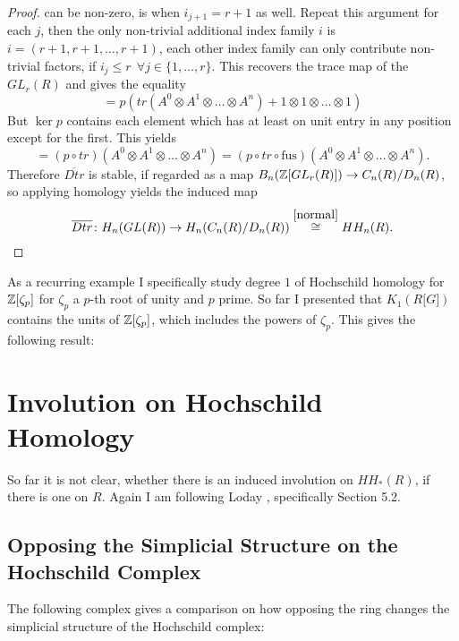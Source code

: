 {\begin{proof}
can be non-zero, is when $i_{j+1}=r+1$ as well. Repeat this argument for each $j$, then the only non-trivial additional index
family $i$ is $i=(r+1,r+1,\ldots,r+1)$, each other index family can only contribute
non-trivial factors, if $i_j\leq r  ~~\forall j\in \{1,\ldots,r\}$. This recovers the trace map of the $GL_r(R)$ and gives the equality
$$=p\left(tr( A^0 \otimes A^1 \otimes \ldots \otimes A^n) + 1\otimes 1\otimes\ldots\otimes 1\right)$$
But $\ker p$ contains each element which has at least on unit entry in any position except for the first. This yields
$$=(p\circ tr)( A^0 \otimes A^1 \otimes \ldots \otimes A^n) = (p\circ tr\circ \mathrm{fus})( A^0 \otimes A^1 \otimes \ldots \otimes A^n).$$
Therefore $\overline{Dtr}$ is stable, if regarded as a map $B_n(\mathbb{Z}\lbrack GL_r(R)\rbrack) \rightarrow C_n(R)/D_n(R)$, so applying homology yields the induced map
$$\overline{Dtr}\colon H_n(GL(R))\rightarrow H_n(C_n(R)/D_n(R)) \stackrel{\mathrm{\ref{normal}}}{\cong}HH_n(R).$$
\end{proof}}

As a recurring example I specifically study degree $1$ of Hochschild homology for $\mathbb{Z}\lbrack \zeta_p \rbrack$ for $\zeta_p$ a $p$-th root of unity and $p$ prime.
So far I presented  that $K_1(R\lbrack G \rbrack)$ contains the units of $\mathbb{Z}\lbrack \zeta_p \rbrack$, which includes the powers of $\zeta_p$.
This gives the following result:



\section{Involution on Hochschild Homology}
So far it is not clear, whether there is an induced involution on $HH_*(R)$, if there is one on $R$.
Again I am following Loday \cite{LCy}, specifically Section 5.2.

\subsection{Opposing the Simplicial Structure on the Hochschild Complex}
The following complex gives a comparison on how opposing the ring changes the simplicial structure of the Hochschild complex:

